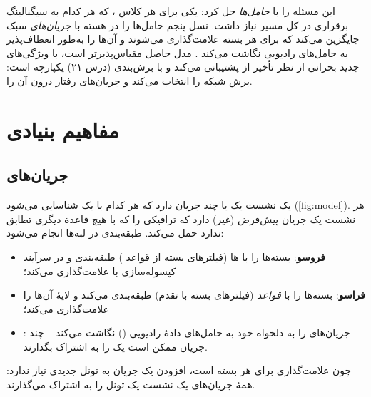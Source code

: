 \documentclass[11pt,a4paper]{article}
\begin{document}
 این مسئله را با \emph{حامل‌ها} حل کرد: یکی برای هر کلاس ، که هر کدام به سیگنالینگ برقراری در کل مسیر نیاز داشت. نسل
پنجم حامل‌ها را در هسته با \emph{جریان‌های } سبک جایگزین می‌کند که برای هر بسته علامت‌گذاری می‌شوند و  آن‌ها را
به‌طور انعطاف‌پذیر به حامل‌های رادیویی نگاشت می‌کند \cite{ts23501}. مدل حاصل مقیاس‌پذیرتر است، با ویژگی‌های جدید بحرانی از نظر تأخیر از
 پشتیبانی می‌کند و با برش‌بندی (درس ۲۱) یکپارچه است: برش شبکه را انتخاب می‌کند و جریان‌های  رفتار درون آن را.

\section{مفاهیم بنیادی}

\subsection{جریان‌های }
یک نشست  یک یا چند جریان  دارد که هر کدام با یک  شناسایی می‌شود (\cref{fig:model}). هر نشست  یک
جریان  پیش‌فرض (غیر) دارد که ترافیکی را که با هیچ قاعدهٔ دیگری تطابق ندارد حمل می‌کند. طبقه‌بندی در لبه‌ها انجام
می‌شود:
\begin{itemize}
  \item \textbf{فروسو}:  بسته‌ها را با ها (فیلترهای بسته از قواعد ) طبقه‌بندی و در سرآیند کپسوله‌سازی
         با  علامت‌گذاری می‌کند؛
  \item \textbf{فراسو}:  بسته‌ها را با \emph{قواعد } (فیلترهای بسته با تقدم) طبقه‌بندی می‌کند و لایهٔ  آن‌ها
        را علامت‌گذاری می‌کند؛
  \item \textbf{}:  جریان‌های  را به دلخواه خود به حامل‌های دادهٔ رادیویی () نگاشت می‌کند -- چند
        جریان ممکن است یک  را به اشتراک بگذارند.
\end{itemize}
چون علامت‌گذاری  برای هر بسته است، افزودن یک جریان  به تونل جدیدی نیاز ندارد: همهٔ جریان‌های یک نشست  یک
تونل  را به اشتراک می‌گذارند.

\begin{acnfigure}
  \caption{مدل  نسل پنجم: طبقه‌بندی در  و ، علامت‌گذاری  روی ، نگاشت جریان به 
           توسط  در .}
  \label{fig:model}
\end{acnfigure}
\end{document}
